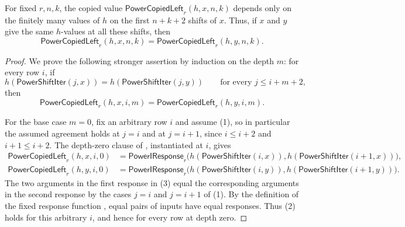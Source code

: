 \begin{lemma}
For fixed $r,n,k$, the copied value
$\mathsf{PowerCopiedLeft}_r(h,x,n,k)$ depends only on the finitely many
values of $h$ on the first $n+k+2$ shifts of $x$.  Thus, if $x$ and $y$
give the same $h$-values at all these shifts, then
\[
\mathsf{PowerCopiedLeft}_r(h,x,n,k)
=\mathsf{PowerCopiedLeft}_r(h,y,n,k).
\]
\end{lemma}
\begin{proof}
We prove the following stronger assertion by induction on the depth $m$:
for every row $i$, if
\[
 h(\mathsf{PowerShiftIter}(j,x))
 =h(\mathsf{PowerShiftIter}(j,y))
 \qquad\text{for every }j\leq i+m+2,
 \tag{1}
\]
then
\[
 \mathsf{PowerCopiedLeft}_r(h,x,i,m)
 =\mathsf{PowerCopiedLeft}_r(h,y,i,m).
 \tag{2}
\]

For the base case $m=0$, fix an arbitrary row $i$ and assume (1), so in
particular the assumed agreement holds at $j=i$ and at $j=i+1$, since
$i\leq i+2$ and $i+1\leq i+2$.  The depth-zero clause of
, instantiated at $i$, gives
\[
\begin{aligned}
\mathsf{PowerCopiedLeft}_r(h,x,i,0)
  &=\mathsf{PowerIResponse}_r\bigl(
      h(\mathsf{PowerShiftIter}(i,x)),
      h(\mathsf{PowerShiftIter}(i+1,x))\bigr),\\
\mathsf{PowerCopiedLeft}_r(h,y,i,0)
  &=\mathsf{PowerIResponse}_r\bigl(
      h(\mathsf{PowerShiftIter}(i,y)),
      h(\mathsf{PowerShiftIter}(i+1,y))\bigr).
\end{aligned}
\tag{3}
\]
The two arguments in the first response in (3) equal the corresponding
arguments in the second response by the cases $j=i$ and $j=i+1$ of (1).
By the definition of the fixed response function
, equal pairs of inputs have equal responses.
Thus (2) holds for this arbitrary $i$, and hence for every row at depth
zero.


\end{proof}
